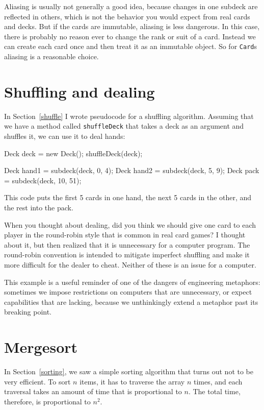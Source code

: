 
Aliasing is usually not generally a good idea, because
changes in one subdeck are reflected in others, which is not the
behavior you would expect from real cards and decks.  But if the
cards are immutable, aliasing is less dangerous.
In this case, there is probably no reason ever to change the
rank or suit of a card.  Instead we can create each card
once and then treat it as an immutable object.  So for {\tt Card}s
aliasing is a reasonable choice.


\section{Shuffling and dealing}

In Section~\ref{shuffle} I wrote pseudocode for a shuffling algorithm.
Assuming that we have a method called {\tt shuffleDeck} that takes
a deck as an argument and shuffles it, we can use it to deal hands:

\begin{code}
    Deck deck = new Deck();
    shuffleDeck(deck);

    Deck hand1 = subdeck(deck, 0, 4);
    Deck hand2 = subdeck(deck, 5, 9);
    Deck pack = subdeck(deck, 10, 51);
\end{code}
%
This code puts the first 5 cards in one hand, the next 5 cards
in the other, and the rest into the pack.

When you thought about dealing, did you think we should give one
card to each player in the round-robin style that is common
in real card games?  I thought about it, but then realized that it is
unnecessary for a computer program.  The round-robin convention is
intended to mitigate imperfect shuffling and make it more difficult
for the dealer to cheat.  Neither of these is an issue for a computer.

This example is a useful reminder of one of the dangers of engineering
metaphors: sometimes we impose restrictions on computers that are
unnecessary, or expect capabilities that are lacking, because we
unthinkingly extend a metaphor past its breaking point.


\section{Mergesort}
\label{mergesort}

In Section~\ref{sorting}, we saw a simple sorting algorithm that turns
out not to be very efficient.  To sort $n$ items, it has to
traverse the array $n$ times, and each traversal takes an amount of
time that is proportional to $n$.  The total time, therefore, is
proportional to $n^2$.

